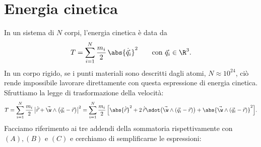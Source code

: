 \section{Energia cinetica}

In un sistema di \(N\) corpi, l'energia cinetica è data da
\[
	T = \sum_{i=1}^N \frac{m_i}{2}\,\abs{\dot{\vec{q}}_i}^2 \qquad\text{con }\vec{q}_i\in\R^3.
\]
In un corpo rigido, se i punti materiali sono descritti dagli atomi, \(N\approx 10^{24}\), ciò rende impossibile lavorare direttamente con questa espressione di energia cinetica.
Sfruttiamo la legge di trasformazione della velocità:
\[
	T = \sum_{i=1}^N \frac{m_i}{2}\,\big\lvert \dot{\vec{r}}+\vec{\w}\wedge\big(\vec{q}_i-\vec{r}\big)\big\rvert^2 = \sum_{i=1}^N \frac{m_i}{2}\,\Big[\abs{\dot{\vec{r}}}^2+2\,\dot{\vec{r}}\sdot\big(\vec{\w}\wedge(\vec{q}_i-\vec{r})\big)+\abs{\vec{\w}\wedge(\vec{q}_i-\vec{r})}^2\Big].
\]
Facciamo riferimento ai tre addendi della sommatoria rispettivamente con \((A),(B)\) e \((C)\) e cerchiamo di semplificarne le espressioni:
